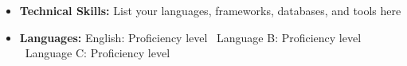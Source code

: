\begin{itemize}[parsep=0.5ex]
  \item \textbf{Technical Skills:} List your languages, frameworks, databases, and tools here
  \item \textbf{Languages:} English: Proficiency level \textbar\ Language B: Proficiency level \textbar\ Language C: Proficiency level
\end{itemize}
